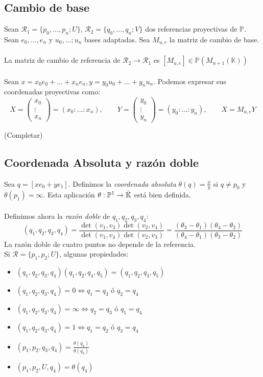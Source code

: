\documentclass[leqno]{article}
\newcommand{\K}{\mathbb{K}}
\renewcommand{\P}{\mathbb{P}}
\newcommand{\Rcal}{\mathcal{R}}
\begin{document}
\subsection{Cambio de base}
Sean $\Rcal_1 = \{p_0, \ldots, p_n; U\}$, $\Rcal_2 = \{q_0, \ldots, q_n; V\}$ dos referencias proyectivas de $\P$. Sean $e_0, \ldots, e_n$ y $u_0, \ldots;u_n$ bases adaptadas. Sea $M_{u,e}$ la matriz de cambio de base. \\
\\
La matriz de cambio de referencia de $\Rcal_2\to \Rcal_1$ es $[M_{u, e}]\in \P(M_{n+1}(\mathbb{K}))$\\
\\
Sean $x = x_0e_0 + \ldots + x_ne_n, y = y_0u_0 + \ldots + y_nu_n$. Podemos expresar sus coordenadas proyectivas como:
$$
X = \begin{pmatrix} x_0 \\ \vdots \\ x_n \end{pmatrix} = (x_0:\ldots:x_n) , \qquad Y = \begin{pmatrix} y_0 \\ \vdots \\ y_n \end{pmatrix} = (y_0:\ldots:y_n), \qquad X = M_{u, e}Y
$$

(Completar)

\subsection{Coordenada Absoluta y razón doble}
Sea $q = [xe_0 + ye_1]$. Definimos la \textit{coordenada absoluta} $\theta(q) = \frac{x}{y}$ si $q\neq p_0$ y $\theta(p_1) = \infty$. Esta aplicación $\theta :\P^1 \to \Bar{\K}$ está bien definida. \\
\\
Definimos ahora la \textit{razón doble} de $q_1, q_2, q_3, q_4$:
$$
(q_1, q_2, q_3, q_4) = \frac{\det(v_1, v_3) \det(v_2, v_4)}{\det(v_1, v_4) \det(v_2, v_3)} = \frac{(\theta_3 - \theta_1)(\theta_4-\theta_2)}{(\theta_4 - \theta_1)(\theta_3 - \theta_2)}
$$
La razón doble de cuatro puntos no depende de la referencia. \\
Si $\Rcal=\{p_1, p_2;U\}$, algunas propiedades:
\begin{itemize}
 \item $(q_1, q_2, q_3, q_4)(q_1, q_2, q_4, q_5) = (q_1, q_2, q_3, q_5)$
 \item $(q_1, q_2, q_3, q_4) = 0 \iff q_1 = q_3$ ó $q_2 = q_4$
 \item $(q_1, q_2, q_3, q_4) = \infty \iff q_2 = q_3$ ó $q_1 = q_4$
 \item $(q_1, q_2, q_3, q_4) = 1 \iff q_1 = q_2$ ó $q_3 = q_4$
 \item $(p_1, p_2, q_3, q_4)=\frac{\theta(q_4)}{\theta(q_3)}$  
 \item $(p_1, p_2, U, q_4)=\theta(q_4)$
\end{itemize}
\end{document}
